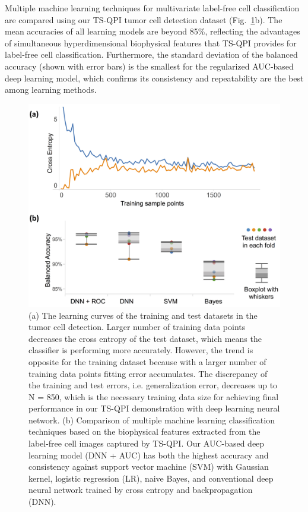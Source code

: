 \documentclass[aps,pra,reprint,longbibliography,superscriptaddress]{revtex4-1}
\begin{document}
Multiple machine learning techniques for multivariate label-free cell classification are compared using our TS-QPI tumor cell detection dataset (Fig.~\ref{fig:LearningCurve}b). The mean accuracies of all learning models are beyond 85\%, reflecting the advantages of simultaneous hyperdimensional biophysical features that TS-QPI provides for label-free cell classification. Furthermore, the standard deviation of the balanced accuracy (shown with error bars) is the smallest for the regularized AUC-based deep learning model, which confirms its consistency and repeatability are the best among learning methods.

\begin{figure}
\includegraphics[scale=0.1]{FigureLearningCurve.jpg}
\caption{\label{fig:LearningCurve} (a) The learning curves of the training and test datasets in the tumor cell detection. Larger number of training data points decreases the cross entropy of the test dataset, which means the classifier is performing more accurately. However, the trend is opposite for the training dataset because with a larger number of training data points fitting error accumulates. The discrepancy of the training and test errors, i.e. generalization error, decreases up to N = 850, which is the necessary training data size for achieving final performance in our TS-QPI demonstration with deep learning neural network. (b) Comparison of multiple machine learning classification techniques based on the biophysical features extracted from the label-free cell images captured by TS-QPI. Our AUC-based deep learning model (DNN + AUC) has both the highest accuracy and consistency against support vector machine (SVM) with Gaussian kernel, logistic regression (LR), naive Bayes, and conventional deep neural network trained by cross entropy and backpropagation (DNN).}
\end{figure}
\end{document}
